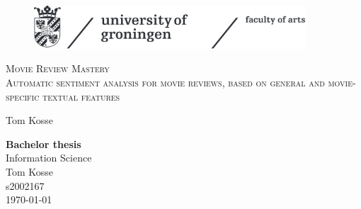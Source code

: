 \documentclass[
10pt, %
a4paper, %
oneside, %
headinclude,footinclude, %
] {book}%
\title{\normalfont\spacedallcaps{title}} %
\author{\spacedlowsmallcaps{author}} %
\date{} %
\begin{document}


\pagestyle{scrheadings} %



\hypersetup{pageanchor=false}
\begin{titlepage}
\thispagestyle{empty}
\begin{figure}[h!] %
\includegraphics[width=4in]{ruglogo} 
\end{figure}

\begin{center}
\vspace{30 mm}
\begingroup \linespread{1,75} \selectfont 
\textsc{\LARGE Movie Review Mastery}\\
\textsc{\Large Automatic sentiment analysis for movie reviews, based on general and movie-specific textual features}\\[1,5cm]
\endgroup

Tom Kosse\\[2,5cm]

\end{center}
\vfill
\textbf{Bachelor thesis}\\  %
Information Science\\  %
Tom Kosse\\
s2002167\\
\today
\end{titlepage}
\hypersetup{pageanchor=true}
\end{document}

